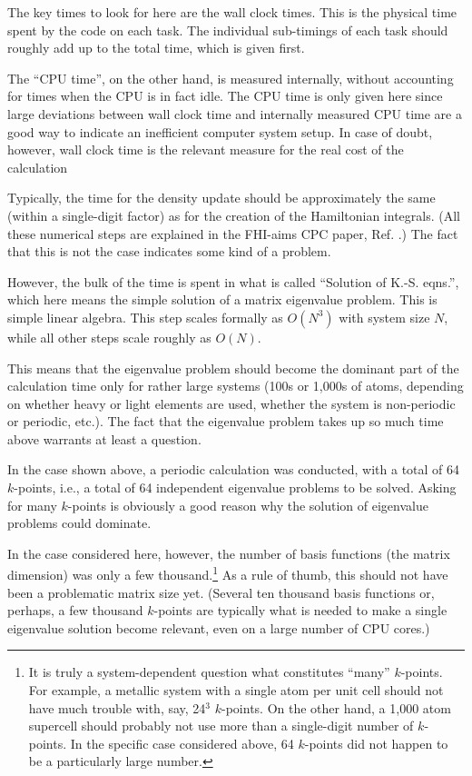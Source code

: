 The key times to look for here are the wall clock times. This is the
physical time spent by the code on each task. The individual
sub-timings of each task should roughly add up to the total time,
which is given first. 

The ``CPU time'', on the
other hand, is measured internally, without accounting for times when
the CPU is in fact idle. The CPU time is only given here since large
deviations between wall clock time and internally measured CPU time
are a good way to indicate an inefficient computer system setup. In
case of doubt, however, wall clock time is the relevant measure for
the real cost of the calculation

Typically, the time for
the density update should be approximately the same (within a single-digit
factor) as for the creation of the Hamiltonian integrals. (All these
numerical steps are explained in the FHI-aims CPC paper,
Ref. \cite{Blum08}.) The fact that this is not the case indicates some
kind of a problem.

However, the bulk of the time is spent in what is called ``Solution of
K.-S. eqns.'', which here means the simple solution of a matrix
eigenvalue problem. This is simple linear algebra. This step scales
formally as $O(N^3)$ with system size $N$, while all other steps scale
roughly as $O(N)$. 

This means that the eigenvalue problem should become the dominant part
of the calculation time only for rather large systems (100s or 1,000s
of atoms, depending on whether heavy or light elements are used,
whether the system is non-periodic or periodic, etc.). The fact that
the eigenvalue problem takes up so much time above warrants at least a
question. 

In the case shown above, a periodic calculation was conducted, with a
total of 64 $k$-points, i.e., a total of 64 independent eigenvalue
problems to be solved. Asking for many $k$-points is obviously a good
reason why the solution of eigenvalue problems could dominate. 

In the case considered here, however, the number of basis functions
(the matrix dimension) was only a few thousand.\footnote{It is truly a
  system-dependent question what constitutes ``many''
  $k$-points. For example, a metallic system 
  with a single atom per unit cell should not have much trouble with,
  say, 24$^3$ $k$-points. On the other hand, a 1,000 atom supercell
  should probably not use more than a single-digit number of
  $k$-points. In the specific case considered above, 64 $k$-points did
  not happen to be a particularly large number.} 
As a rule of thumb, this should not have been a problematic matrix
size yet. (Several ten thousand basis functions or, perhaps, a few
thousand $k$-points are typically what is needed to make a single
eigenvalue solution become relevant, even on a large number of CPU
cores.) 

